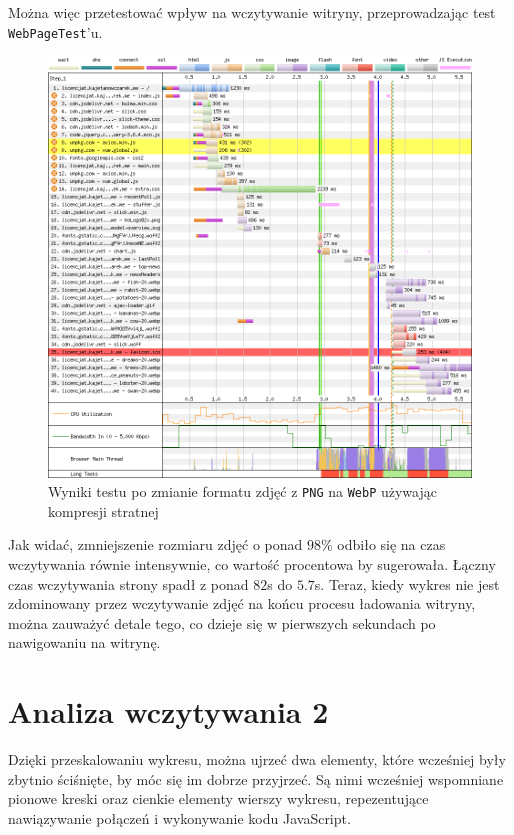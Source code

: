 \documentclass[licencjacka]{pracadypl}
\begin{document}
Można więc przetestować wpływ na wczytywanie witryny, przeprowadzając test \texttt{WebPageTest}'u.

\begin{figure}[H]
  \includegraphics[width=\linewidth]{images/waterfall-after-webp.png}
  \caption{Wyniki testu po zmianie formatu zdjęć z \texttt{PNG} na \texttt{WebP} używając kompresji stratnej}
  \label{fig:waterfall-after-webp}
\end{figure}

Jak widać, zmniejszenie rozmiaru zdjęć o ponad $98\%$ odbiło się na czas wczytywania równie intensywnie, co wartość procentowa by sugerowała. Łączny czas wczytywania strony spadł z ponad $82$s do $5.7$s. Teraz, kiedy wykres nie jest zdominowany przez wczytywanie zdjęć na końcu procesu ładowania witryny, można zauważyć detale tego, co dzieje się w pierwszych sekundach po nawigowaniu na witrynę.

\section{Analiza wczytywania 2}
Dzięki przeskalowaniu wykresu, można ujrzeć dwa elementy, które wcześniej były zbytnio ściśnięte, by móc się im dobrze przyjrzeć. Są nimi wcześniej wspomniane pionowe kreski oraz cienkie elementy wierszy wykresu, repezentujące nawiązywanie połączeń i wykonywanie kodu JavaScript.
\end{document}
